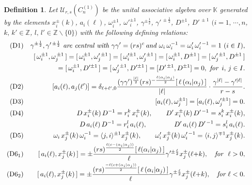 \documentclass{amsproc}
\newtheorem{defi}[theo]{Definition}
\theoremstyle{remark}
\numberwithin{equation}{section}
\begin{document}
\begin{defi} Let ${\mathcal U}_{r,s}(C_n^{(1)})$  be the unital
associative algebra over $\mathbb{K}$ generated by the elements
$x_i^{\pm}(k)$, $a_i(\ell)$, ${\omega}_i^{\pm1}$, ${{\omega}'}_i^{\pm1}$,
$\gamma^{\pm\frac{1}{2}}$, ${\gamma'}^{\,\pm\frac{1}2}$, $D^{\pm1}$,
$D'^{\,\pm1}$ $(i=1,\,\cdots, n$, $k,\,k' \in \mathbb{Z}$, $l,\,l' \in
\mathbb{Z}\backslash \{0\})$ with the following defining relations:
\begin{eqnarray*}
({\rm D1})&&\gamma^{\pm\frac{1}{2}}, \gamma'^{\,\pm\frac{1}{2}}
\textit{ are central with } \gamma\gamma'=(rs)^{c}\,\textit{and }
\omega_i\,\omega_i^{-1}=\omega_i'\,\omega_i'^{\,-1}=1 \
(i\in I),\\
&& [\,\omega_i^{\pm 1}, \omega_j^{\,\pm 1}\,]=[\,\omega_i^{\pm 1},
\omega_j'^{\,\pm 1}\,]=[\,\omega_i'^{\pm 1}, \omega_j'^{\,\pm
1}\,]=[\,{\omega}_i^{\pm1}, D^{\pm1}\,]=[\,{\omega}_j'^{\,\pm1},
D^{\pm1}\,]\\
&&=[\,{\omega}_i^{\pm1}, D'^{\pm1}\,]=[\,{\omega}_j'^{\,\pm1},
D'^{\pm1}\,]=[D'^{\,\pm1}, D^{\pm1}]=0, \ \textit{for } \, i,\,j\in I.\\
({\rm D2})
 &&[a_i(\ell),a_j(\ell')]
=\delta_{\ell+\ell',0}\frac{
(\gamma\gamma')^{\frac{|\ell|}{2}}(rs)^{-\frac{\ell (\alpha_i|\alpha_j)}2}[\,\ell\,
(\alpha_i|\alpha_j)\,]}{|\ell|}
\cdot\frac{\gamma^{|\ell|}-\gamma'^{|\ell|}}{r-s}.\\
({\rm D3})&&[a_i(\ell),{\omega}_j^{{\pm }1}]=[a_i(\ell),{\omega}_j'^{\pm
1}]=0.\\
({\rm D4})&& D\,x_i^{\pm}(k)\,D^{-1}=r_i^k\, x_i^{\pm}(k), \qquad
D'\,x_i^{\pm}(k)\,D'^{\,-1}=s_i^k\, x_i^{\pm}(k), \\
&&D\,
a_i(\ell)\,D^{-1}=r_i^l\,a_i(\ell), \qquad\qquad D'\,
a_i(\ell)\,D'^{\,-1}=s_i^l\,a_i(\ell).\\
({\rm D5}) &&{\omega}_i\,x_j^{\pm}(k)\, {\omega}_i^{-1} =  \langle j,
i\rangle^{\pm 1} x_j^{\pm}(k), \qquad {\omega}'_i\,x_j^{\pm}(k)\,
{\omega}_i'^{\,-1} =  \langle i, j\rangle ^{\mp1}x_j^{\pm}(k).\\
({\rm D6_1})&&[\,a_i(\ell),x_j^{\pm}(k)\,]=\pm\frac{
(rs)^{\frac{\ell(c-(\alpha_i|\alpha_j))}{2}}[\,\ell
(\alpha_i|\alpha_j)\,]}{\ell}\gamma'^{\pm\frac{\ell}2}x_j^{\pm}(\ell{+}k),
 \quad \textit{for } \ \ell>0, \\
({\rm D6_2})&&[\,a_i(\ell),x_j^{\pm}(k)\,]=\pm\frac{
(rs)^{\frac{-\ell (c+(\alpha_i|\alpha_j))}{2}}[\,\ell\,
(\alpha_i|\alpha_j)\,]}{\ell}\gamma^{\pm\frac{\ell}2}x_j^{\pm}(\ell{+}k),
\quad \textit{for } \ell<0. \\

\end{eqnarray*}
\end{defi}
\end{document}
